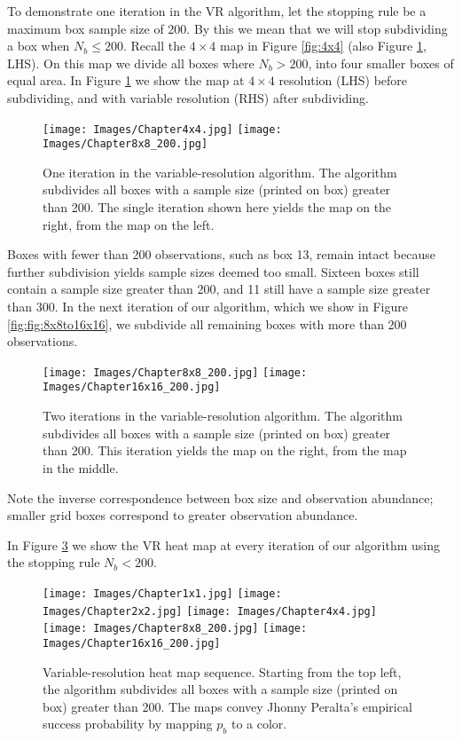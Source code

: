To demonstrate one iteration in the VR algorithm, let the stopping rule be a maximum box sample size of 200. By this we mean that we will stop subdividing a box when $N_{b} \leq 200$. Recall the $4 \times 4$ map in Figure \ref{fig:4x4} (also Figure \ref{fig:4x4and8x8}, LHS). On this map we divide all boxes where $N_{b} > 200$, into four smaller boxes of equal area. In Figure \ref{fig:4x4and8x8} we show the map at $4 \times 4$ resolution (LHS) before subdividing, and with variable resolution (RHS) after subdividing.
        \begin{figure}[H]
      	\centering
      	\texttt{[image: Images/Chapter4x4.jpg]} 
      	\texttt{[image: Images/Chapter8x8\_200.jpg]} 
      	\caption{One iteration in the variable-resolution algorithm. The algorithm subdivides all boxes with a sample size (printed on box) greater than 200. The single iteration shown here yields the map on the right, from the map on the left.}
      	\label{fig:4x4and8x8}
      	\end{figure} 
Boxes with fewer than 200 observations, such as box 13, remain intact because further subdivision yields sample sizes deemed too small. Sixteen boxes still contain a sample size greater than 200, and 11 still have a sample size greater than 300. In the next iteration of our algorithm, which we show in Figure \ref{fig:fig:8x8to16x16}, we subdivide all remaining boxes with more than 200 observations. 
        \begin{figure}[H]
      	\centering
      	\label{fig:8x8to16x16}
      	\texttt{[image: Images/Chapter8x8\_200.jpg]} 
      	\texttt{[image: Images/Chapter16x16\_200.jpg]} 
      	\caption{Two iterations in the variable-resolution algorithm. The algorithm subdivides all boxes with a sample size (printed on box) greater than 200. This iteration yields the map on the right, from the map in the middle.}
      	\end{figure}
Note the inverse correspondence between box size and observation abundance; smaller grid boxes correspond to greater observation abundance.

In Figure \ref{fig:allvr} we show the VR heat map at every iteration of our algorithm using the stopping rule $N_{b} < 200$.
        \begin{figure}[H]
      	\centering
      	\texttt{[image: Images/Chapter1x1.jpg]}
      	\texttt{[image: Images/Chapter2x2.jpg]}
      	\texttt{[image: Images/Chapter4x4.jpg]}
      	\texttt{[image: Images/Chapter8x8\_200.jpg]} 
      	\texttt{[image: Images/Chapter16x16\_200.jpg]} 
      	\caption{Variable-resolution heat map sequence. Starting from the top left, the algorithm subdivides all boxes with a sample size (printed on box) greater than 200. The maps convey Jhonny Peralta's empirical success probability by mapping $p_{b}$ to a color.}
      	\label{fig:allvr}
      	\end{figure}
      	
